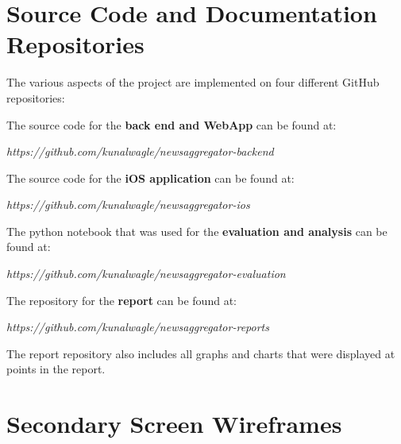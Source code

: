 \documentclass[12pt]{article}
\begin{document}
\begin{appendices}


\section{Source Code and Documentation Repositories}

The various aspects of the project are implemented on four different GitHub \cite{github} repositories:

The source code for the \textbf{back end and WebApp} can be found at:

\begin{displayquote}\emph{
https://github.com/kunalwagle/newsaggregator-backend\\}
\end{displayquote}

The source code for the \textbf{iOS application} can be found at:

\begin{displayquote}\emph{
https://github.com/kunalwagle/newsaggregator-ios\\}
\end{displayquote}

The python notebook that was used for the \textbf{evaluation and analysis} can be found at:

\begin{displayquote}\emph{
https://github.com/kunalwagle/newsaggregator-evaluation\\}
\end{displayquote}

The repository for the \textbf{report} can be found at:

\begin{displayquote}\emph{
https://github.com/kunalwagle/newsaggregator-reports\\}
\end{displayquote}

The report repository also includes all graphs and charts that were displayed at points in the report. 


\newpage

\section{Secondary Screen Wireframes}


\end{appendices}
\end{document}

